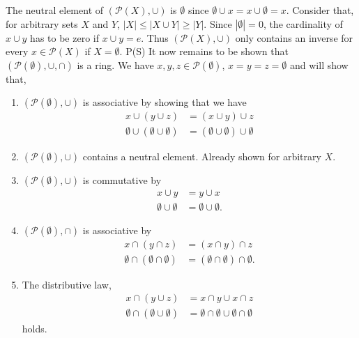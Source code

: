 \documentclass{article}
\begin{document}
The neutral element of $(\mathcal{P}(X), \cup)$ is $\emptyset$ since $\emptyset \cup x = x \cup \emptyset = x$. Consider that, for arbitrary sets $X$ and $Y$, $|X| \leq |X \cup Y| \geq |Y|$. Since $|\emptyset| = 0$, the cardinality of $x \cup y$ has to be zero if $x \cup y = e$. Thus $(\mathcal{P}(X), \cup)$ only contains an inverse for every $x \in \mathcal{P}(X)$ if $X = \emptyset$.
P(S)
It now remains to be shown that $(\mathcal{P}(\emptyset), \cup, \cap)$ is a ring. We have $x, y, z \in \mathcal{P}(\emptyset)$, $x = y = z = \emptyset$ and will show that,
\begin{enumerate}
    \item $(\mathcal{P}(\emptyset), \cup)$ is associative by showing that we have
    \begin{align*}
        x \cup (y \cup z) &= (x \cup y) \cup z \\
        \emptyset \cup (\emptyset \cup \emptyset) &= (\emptyset \cup \emptyset) \cup \emptyset
    \end{align*}
    
    \item $(\mathcal{P}(\emptyset), \cup)$ contains a neutral element. Already shown for arbitrary $X$.
    
    \item $(\mathcal{P}(\emptyset), \cup)$ is commutative by
    \begin{align*}
        x \cup y &= y \cup x \\
        \emptyset \cup \emptyset &= \emptyset \cup \emptyset.
    \end{align*}
    
    \item $(\mathcal{P}(\emptyset), \cap)$ is associative by
    \begin{align*}
        x \cap (y \cap z) &= (x \cap y) \cap z \\
        \emptyset \cap (\emptyset \cap \emptyset) &= (\emptyset \cap \emptyset) \cap \emptyset.
    \end{align*}
    
    \item The distributive law,
    \begin{align*}
        x \cap (y \cup z) &= x \cap y \cup x \cap z \\
        \emptyset \cap (\emptyset \cup \emptyset) &= \emptyset \cap \emptyset \cup \emptyset \cap \emptyset
    \end{align*}
    holds.
\end{enumerate}
\end{document}
